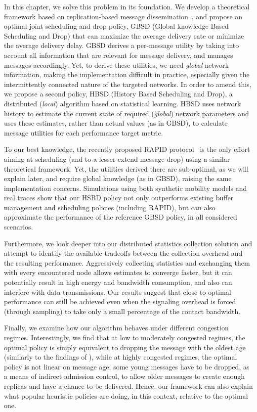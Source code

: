 In this chapter, we solve this problem in its foundation. We develop a theoretical framework based on replication-based message dissemination~\cite{haas:mobihoc03,Inria:MessageDelay,akis:mobihoc06}, and propose an optimal joint scheduling and drop policy, GBSD (Global knowledge Based Scheduling and Drop) that can maximize the average delivery rate or minimize the average delivery delay. GBSD derives a per-message utility by taking into account all information that are relevant for message delivery, and manages messages accordingly. Yet, to derive these utilities, we need \textit{global} network information, making the implementation difficult in practice, especially given the intermittently connected nature of the targeted networks. In order to amend this, we propose a second policy, HBSD (History Based Scheduling and Drop), a distributed (\textit{local}) algorithm based on statistical learning. HBSD uses network history to estimate the current state of required (\textit{global}) network parameters and uses these estimates, rather than actual values (as in GBSD), to calculate message utilities for each performance target metric.

To our best knowledge, the recently proposed RAPID protocol~\cite{Levine:Sigcomm07} is the only effort aiming at scheduling (and to a lesser extend message drop) using a similar theoretical framework. Yet, the utilities derived there are sub-optimal, as we will explain later, and require global knowledge (as in GBSD), raising the same implementation concerns. Simulations using both synthetic mobility models and real traces show that our HSBD policy not only outperforms existing buffer management and scheduling policies (including RAPID), but can also approximate the performance of the reference GBSD policy, in all considered scenarios.

Furthermore, we look deeper into our distributed statistics collection solution and attempt to identify the available tradeoffs between the collection overhead and the resulting performance. Aggressively collecting statistics and exchanging them with every encountered node allows estimates to converge faster, but it can potentially result in high energy and bandwidth consumption, and also can interfere with data transmissions. Our results suggest that close to optimal performance can still be achieved even when the signaling overhead is forced (through sampling) to take only a small percentage of the contact bandwidth.

Finally, we examine how our algorithm behaves under different congestion regimes. Interestingly, we find that at low to moderately congested regimes, the optimal policy is simply equivalent to dropping the message with the oldest age (similarly to the findings of \cite{QueuingPolicies}), while at highly congested regimes, the optimal policy is not linear on message age; some young messages have to be dropped, as a means of indirect admission control, to allow older messages to create enough replicas and have a chance to be delivered. Hence, our framework can also explain what popular heuristic policies are doing, in this context, relative to the optimal one.


